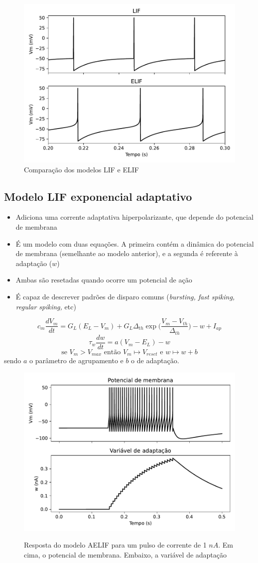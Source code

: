 \begin{figure}[h!]
	\centering
	\caption{Comparação dos modelos LIF e ELIF}
	\label{fig:elif}
	\includegraphics[width=0.7\linewidth]{figs/elif}
\end{figure}


\subsection{Modelo LIF exponencial adaptativo}
\begin{itemize}
	\item Adiciona uma corrente adaptativa hiperpolarizante, que depende do potencial de membrana
	\item É um modelo com duas equações. A primeira contém a dinâmica do potencial de membrana (semelhante ao modelo anterior), e a segunda é referente à adaptação ($w$)
	\item Ambas são resetadas quando ocorre um potencial de ação
	\item É capaz de descrever padrões de disparo comuns (\textit{bursting, fast spiking, regular spiking,} etc)
\end{itemize}
$$
c_m\frac{dV_m}{dt} = G_L(E_L-V_m) + G_L\Delta_{th}\exp\Big(\frac{V_m-V_{th}}{\Delta_{th}}\Big) - w + I_{ap}
$$$$
\tau_w\frac{dw}{dt}=a(V_m-E_L)-w
$$$$
\text{se } V_m > V_{max} \text{ então } V_m\mapsto V_{reset} \text{ e } w\mapsto w + b
$$
sendo $a$ o parâmetro de agrupamento e $b$ o de adaptação.

\begin{figure}[h!]
	\centering
	\caption{Resposta do modelo AELIF para um pulso de corrente de 1 $nA$. Em cima, o potencial de membrana. Embaixo, a variável de adaptação}
	\label{fig:adexrs}
	\includegraphics[width=0.7\linewidth]{figs/aelif}\\
\end{figure}


